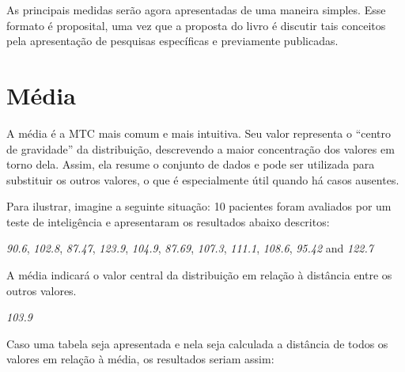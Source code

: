 \documentclass[
]{book}
\begin{document}
As principais medidas serão agora apresentadas de uma maneira simples.
Esse formato é proposital, uma vez que a proposta do livro é discutir
tais conceitos pela apresentação de pesquisas específicas e previamente
publicadas.

\hypertarget{muxe9dia}{%
\section{Média}\label{muxe9dia}}

A média é a MTC mais comum e mais intuitiva. Seu valor representa o
``centro de gravidade'' da distribuição, descrevendo a maior
concentração dos valores em torno dela. Assim, ela resume o conjunto de
dados e pode ser utilizada para substituir os outros valores, o que é
especialmente útil quando há casos ausentes.

Para ilustrar, imagine a seguinte situação: 10 pacientes foram avaliados
por um teste de inteligência e apresentaram os resultados abaixo
descritos:

\emph{90.6}, \emph{102.8}, \emph{87.47}, \emph{123.9}, \emph{104.9},
\emph{87.69}, \emph{107.3}, \emph{111.1}, \emph{108.6}, \emph{95.42} and
\emph{122.7}

A média indicará o valor central da distribuição em relação à distância
entre os outros valores.

\emph{103.9}

Caso uma tabela seja apresentada e nela seja calculada a distância de
todos os valores em relação à média, os resultados seriam assim:
\end{document}

